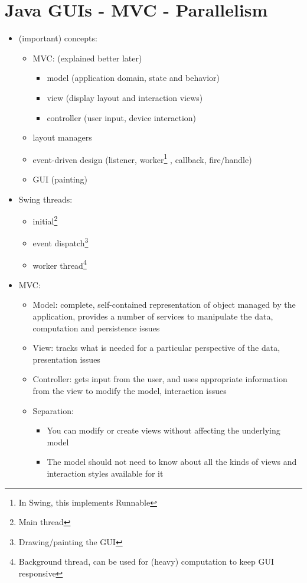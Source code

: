 \documentclass[a4paper]{article}
\begin{document}
\section{Java GUIs - MVC - Parallelism}
\begin{itemize}
\item (important) concepts: 
\begin{itemize}
 \item MVC: (explained better later)
\begin{itemize}
\item model (application domain, state and behavior)
\item view (display layout and interaction views)
\item controller (user input, device interaction)
\end{itemize}
\item layout managers
\item event-driven design  (listener, worker\footnote{In Swing, this implements Runnable} , callback, fire/handle)
\item GUI (painting)
\end{itemize}
\item Swing threads: 
\begin{itemize}
\item initial\footnote{Main thread}
\item event dispatch\footnote{Drawing/painting the GUI}
\item worker thread\footnote{Background thread, can be used for (heavy) computation to keep GUI responsive}
\end{itemize}
\item MVC: 
\begin{itemize}
\item Model: complete, self-contained representation of object managed by the application, provides a number of services to manipulate the data, computation and persistence issues
\item View: tracks what is needed for a particular perspective of the data, presentation issues
\item Controller: gets input from the user, and uses appropriate information from the view to modify the model, interaction issues
\item Separation: 
\begin{itemize}
\item You can modify or create views without affecting the underlying model
\item The model should not need to know about all the kinds of views and interaction styles available for it
\end{itemize}
\end{itemize}
\end{itemize}
\end{document}
